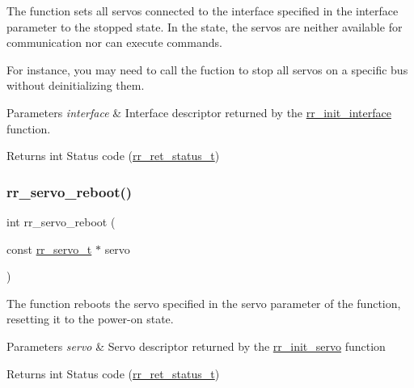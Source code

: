 The function sets all servos connected to the interface specified in the \textquotesingle{}interface\textquotesingle{} parameter to the stopped state. In the state, the servos are neither available for communication nor can execute commands. 

For instance, you may need to call the fuction to stop all servos on a specific bus without deinitializing them.


\begin{DoxyParams}{Parameters}
{\em interface} & Interface descriptor returned by the \hyperlink{group___common_ga472a4890dcc7d7a13123c56a06946d91}{rr\+\_\+init\+\_\+interface} function. \\
\hline
\end{DoxyParams}
\begin{DoxyReturn}{Returns}
int Status code (\hyperlink{api_8h_a92d5be5038abcf89837faf85a08debdc}{rr\+\_\+ret\+\_\+status\+\_\+t}) 
\end{DoxyReturn}
\mbox{\label{group___system__control_ga1239a8f4a80ea1c33f599a0cdc58048c}} 
\subsubsection{\texorpdfstring{rr\+\_\+servo\+\_\+reboot()}{rr\_servo\_reboot()}}
{\footnotesize\ttfamily int rr\+\_\+servo\+\_\+reboot (\begin{DoxyParamCaption}\item[{const \hyperlink{structrr__servo__t}{rr\+\_\+servo\+\_\+t} $\ast$}]{servo }\end{DoxyParamCaption})}



The function reboots the servo specified in the \textquotesingle{}servo\textquotesingle{} parameter of the function, resetting it to the power-\/on state. 


\begin{DoxyParams}{Parameters}
{\em servo} & Servo descriptor returned by the \hyperlink{group___common_ga0adb313a3eeb8a4399431e940a1f3e9e}{rr\+\_\+init\+\_\+servo} function \\
\hline
\end{DoxyParams}
\begin{DoxyReturn}{Returns}
int Status code (\hyperlink{api_8h_a92d5be5038abcf89837faf85a08debdc}{rr\+\_\+ret\+\_\+status\+\_\+t}) 
\end{DoxyReturn}
\mbox{\label{group___system__control_ga59060b95f6ee0614cbec3500ba08b7a0}} 
